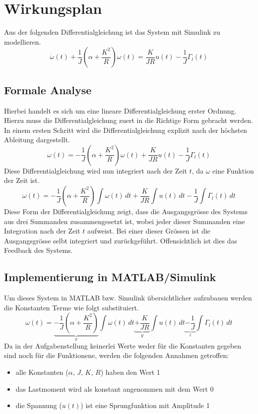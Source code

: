\section{Wirkungsplan}
Aus der folgenden Differentialgleichung ist das System mit Simulink zu
modellieren.
\[
	\dot{\omega}(t)
		+ \frac{1}{J} \left(\alpha + \frac{K^2}{R}\right) \omega(t)
	= \frac{K}{JR} u(t) - \frac{1}{J} \Gamma_l(t)
\]

\subsection{Formale Analyse}
Hierbei handelt es sich um eine lineare Differentialgleichung erster Ordnung.
Hierzu muss die Differentialgleichung zuert in die Richtige Form gebracht
werden. In einem ersten Schritt wird die Differentialgleichung explizit nach
der höchsten Ableitung dargestellt.
\[
	\dot{\omega}(t)
	= - \frac{1}{J} \left(\alpha + \frac{K^2}{R} \right) \omega(t)
		+ \frac{K}{JR} u(t) - \frac{1}{J} \Gamma_l(t)	
\]
Diese Differentialgleichung wird nun integriert nach der Zeit $t$, da $\omega$
eine Funktion der Zeit ist.
\[
	\omega(t)
	= - \frac{1}{J} \left(\alpha + \frac{K^2}{R} \right) \int\omega(t)\,dt
		+ \frac{K}{JR} \int u(t)\,dt
		- \frac{1}{J} \int \Gamma_l(t)\,dt
\]
Diese Form der Differentialgleichung zeigt, dass die Ausgangsgrösse des
Systems aus drei Summanden zusammengesetzt ist, wobei jeder dieser Summanden
eine Integration nach der Zeit $t$ aufweist. Bei einer dieser Grössen ist
die Ausgangsgrösse selbt integriert und zurückgeführt. Offensichtlich ist dies
das Feedback des Systems.

\subsection{Implementierung in MATLAB/Simulink}
Um dieses System in MATLAB bzw. Simulink übersichtlicher aufzubauen werden
die Konstanten Terme wie folgt substituiert.
\[
	\omega(t)
	= \underbrace{- \frac{1}{J} \left(\alpha + \frac{K^2}{R} \right)}_{x}
		\int\omega(t)\,dt
		\underbrace{+ \frac{K}{JR}}_{y} \int u(t)\,dt
		\underbrace{- \frac{1}{J}}_{z} \int \Gamma_l(t)\,dt
\]
Da in der Aufgabenstellung keinerlei Werte weder für die Konstanten gegeben
sind noch für die Funktionene, werden die folgenden Annahmen getroffen:
\begin{itemize}
	\item alle Konstanten ($\alpha$, $J$, $K$, $R$) haben den Wert 1
	\item das Lastmoment wird als konstant angenommen mit dem Wert 0
	\item die Spannung ($u(t)$) ist eine Sprungfunktion mit Amplitude 1
\end{itemize}

